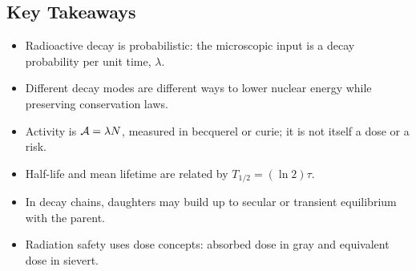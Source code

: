 \subsection*{Key Takeaways}
\begin{itemize}
  \item Radioactive decay is probabilistic: the microscopic input is a decay
  probability per unit time, \(\lambda\).
  \item Different decay modes are different ways to lower nuclear energy while
  preserving conservation laws.
  \item Activity is \(\mathcal{A}=\lambda N\), measured in becquerel or curie; it
  is not itself a dose or a risk.
  \item Half-life and mean lifetime are related by
  \(T_{1/2}=(\ln2)\tau\).
  \item In decay chains, daughters may build up to secular or transient
  equilibrium with the parent.
  \item Radiation safety uses dose concepts: absorbed dose in gray and
  equivalent dose in sievert.
\end{itemize}
